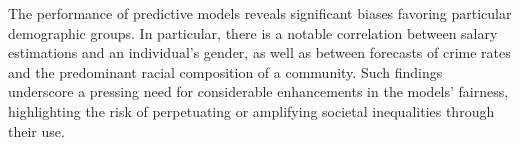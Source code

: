 The performance of predictive models reveals significant biases favoring particular demographic groups. In particular, there is a notable correlation between salary estimations and an individual's gender, as well as between forecasts of crime rates and the predominant racial composition of a community. Such findings underscore a pressing need for considerable enhancements in the models' fairness, highlighting the risk of perpetuating or amplifying societal inequalities through their use.